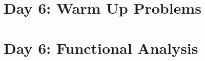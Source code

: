 \documentclass{exam}
\theoremstyle{problemstyle}
\newcommand{\vt}{\vskip 5mm} %
\newcommand{\norm}[1]{\left\lVert#1\right\rVert} %
\newcommand{\1}[1]{\textbf{1}_{\left[#1\right]}} %
\begin{document}
\begin{questions}
\begin{solution}
\begin{comment}
  \vt
  \noindent  \textit{Claim 2:} If $m\neq n$ then $\norm{x_{n}-x_{m}}_{L^{2}([0,1])}\geq \sqrt{2}$.
  \begin{proof}[Proof of Claim 2:]
    Suppose $m\neq n$. Denote $c_{n}= \frac{n+1}{n}$. Then 
    \begin{align*}
      \norm{x_{n}-x_{m}}^{2}_{L^{2}([0,1])}
      &= \langle x_{n}-x_{m}, x_{n}-x_{m}\rangle\\
      &= \langle c_{n} e_{n}-c_{m} e_{m},  c_{n}e_{n}- c_{m}e_{m}\rangle\\
      &=c_{n}^{2}\langle e_{n},e_{n}\rangle -2c_{m}c_{n}\langle e_{n},e_{m}\rangle + c_{m}^{2}\langle e_{m},e_{m}\rangle\\
      &= c_{n}^{2}+ c_{m}^{2}
    \end{align*}
    where the final equality is justified by Claim 1. It follows that
    \begin{equation*}
       \norm{x_{n}-x_{m}}_{L^{2}([0,1])} = \sqrt{c_{n}^{2}+c_{m}^{2}} = \sqrt{\left(1+ \frac{1}{n} \right)^{2}  + \left( 1+\frac{1}{m} \right)^{2}}\geq \sqrt{2}.
     \end{equation*}
     This proves claim 2.
  \end{proof}



Using Claim 1, we see that $\norm{x_{n}}_{L^2([0,1])} = \left( \frac{n+1}{n} \right)\norm{e_{n}}_{L^{2}([0,1])} = 1+\frac{1}{n}$, and from this it is clear that $(x_{n})$ has no element of smallest norm. The fact that $x_{n}$ is closed follows from Claim 2, which implies that any convergent sequence consisting of elements in $\left\{ x_{n} \right\}_{n}$ is eventually constant, and hence its limit point must again be an element in $\left\{ x_{n} \right\}_{n}$.
\end{comment}

  
\end{solution}






\newpage
\section*{Day 6: Warm Up Problems}


\newpage
\section{Day 6: Functional Analysis}


\end{questions}
\end{document}
